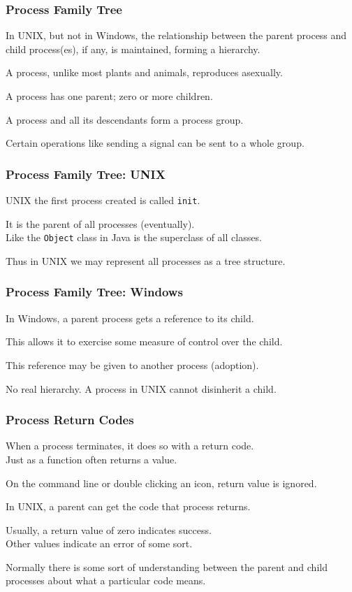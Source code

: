 \begin{frame}
	\frametitle{Process Family Tree}
	In UNIX, but not in Windows, the relationship between the parent process and child process(es), if any, is maintained, forming a hierarchy.

	A process, unlike most plants and animals, reproduces asexually.

	A process has one parent; zero or more children.

	A process and all its descendants form a \alert{process group}.

	Certain operations like sending a signal can be sent to a whole group.

\end{frame}

\begin{frame}
	\frametitle{Process Family Tree: UNIX}
	UNIX the first process created is called \texttt{init}.

	It is the parent of all processes (eventually).\\
	\quad Like the \texttt{Object} class in Java is the superclass of all classes.

	Thus in UNIX we may represent all processes as a tree structure.

\end{frame}

\begin{frame}
	\frametitle{Process Family Tree: Windows}

	In Windows, a parent process gets a reference to its child.

	This allows it to exercise some measure of control over the child.

	This reference may be given to another process (adoption).

	No real hierarchy. A process in UNIX cannot disinherit a child.


\end{frame}

\begin{frame}
	\frametitle{Process Return Codes}

	When a process terminates, it does so with a return code.\\
	\quad  Just as a function often returns a value.

	On the command line or double clicking an icon, return value is ignored.

	In UNIX, a parent can get the code that process returns.

	Usually, a return value of zero indicates success.\\
	\quad Other values indicate an error of some sort.

	Normally there is some sort of understanding between the parent and child processes about what a particular code means.

\end{frame}


